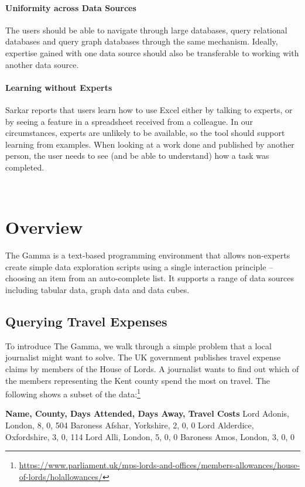 \documentclass{sigchi}
\newcommand{\tg}{The Gamma\xspace}
\begin{document}
\paragraph{Uniformity across Data Sources}
The users should be able to navigate through large databases, query relational databases and
query graph databases through the same mechanism. Ideally, expertise gained with one data source
should also be transferable to working with another data source.

\paragraph{Learning without Experts}
Sarkar \cite{learning} reports that users learn how to use Excel either by talking to experts,
or by seeing a feature in a spreadsheet received from a colleague. In our circumstances, experts
are unlikely to be available, so the tool should support learning from examples. When looking at
a work done and published by another person, the user needs to see (and be able to understand)
how a task was completed.

\newpage
~
\newpage


\section{Overview}
\label{sec:overview}

\tg is a text-based programming environment that allows non-experts create simple data exploration
scripts using a single interaction principle -- choosing an item from an auto-complete list.
It supports a range of data sources including tabular data, graph data and data cubes.

\subsection{Querying Travel Expenses}
To introduce \tg, we walk through a simple problem that a local journalist might want to solve.
The UK government publishes travel expense claims by members of the House of Lords. A journalist
wants to find out which of the members representing the Kent county spend the most on travel.
The following shows a subset of the data:\footnote{ \url{https://www.parliament.uk/mps-lords-and-offices/members-allowances/house-of-lords/holallowances/} }

\begin{thegamma}
\textbf{Name, County, Days Attended, Days Away, Travel Costs}
Lord Adonis, London, 8, 0, 504
Baroness Afshar, Yorkshire, 2, 0, 0
Lord Alderdice, Oxfordshire, 3, 0, 114
Lord Alli, London, 5, 0, 0
Baroness Amos, London, 3, 0, 0
\end{thegamma}
\end{document}
